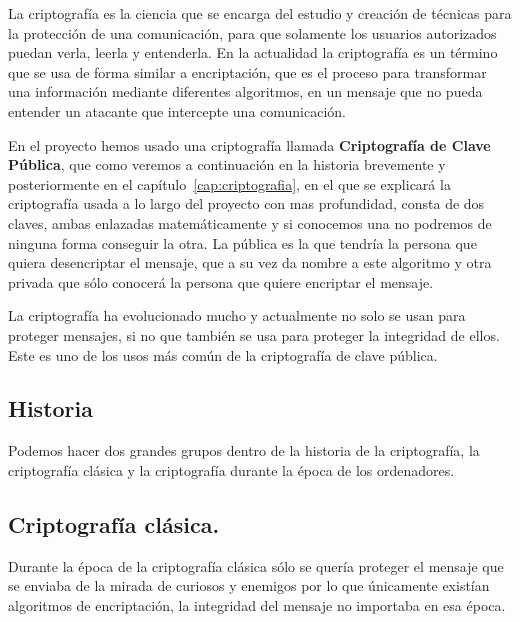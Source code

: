 La criptografía es la ciencia que se encarga del estudio y creación de técnicas para la protección de una comunicación, para que solamente los usuarios autorizados puedan verla, leerla y entenderla. En la actualidad la criptografía es un término que se usa de forma similar a encriptación, que es el proceso para transformar una información mediante diferentes algoritmos, en un mensaje que no pueda entender un atacante que intercepte una comunicación. 

En el proyecto hemos usado una criptografía llamada \textbf{Criptografía de Clave Pública}, que como veremos a continuación en la historia brevemente y posteriormente en el capítulo~\ref{cap:criptografia}, en el que se explicará la criptografía usada a lo largo del proyecto con mas profundidad, consta de dos claves, ambas enlazadas matemáticamente y si conocemos una no podremos de ninguna forma conseguir la otra. La pública es la que tendría la persona que quiera desencriptar el mensaje, que a su vez da nombre a este algoritmo y otra privada que sólo conocerá la persona que quiere encriptar el mensaje.

La criptografía ha evolucionado mucho y actualmente no solo se usan para proteger mensajes, si no que también se usa para proteger la integridad de ellos. Este es uno de los usos más común de la criptografía de clave pública.

\subsection{Historia}

Podemos hacer dos grandes grupos dentro de la historia de la criptografía, la criptografía clásica y la criptografía durante la época de los ordenadores.

\subsection{Criptografía clásica.}

	Durante la época de la criptografía clásica sólo se quería proteger el mensaje que se enviaba de la mirada de curiosos y enemigos por lo que únicamente existían algoritmos de encriptación, la integridad del mensaje no importaba en esa época.  
	
